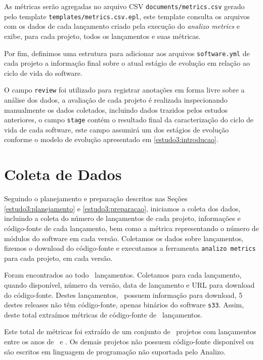 As métricas serão agregadas no arquivo CSV \texttt{documents/metrics.csv}
gerado pelo template \texttt{templates/metrics.csv.epl}, este template consulta
os arquivos com os dados de cada lançamento criado pela execução do {\it analizo metrics}
e exibe, para cada projeto, todos os lançamentos e suas métricas.

Por fim, definimos uma estrutura para adicionar aos arquivos \texttt{software.yml} de
cada projeto a informação final sobre o atual estágio de evolução em relação ao
ciclo de vida do software.

O campo \texttt{review} foi utilizado para registrar anotações em forma livre
sobre a análise dos dados, a avaliação de cada projeto é realizada
inspecionando manualmente os dados coletados, incluindo dados trazidos pelos
estudos anteriores, o campo \texttt{stage} contém o resultado final da
caracterização do ciclo de vida de cada software, este campo assumirá um dos
estágios de evolução conforme o modelo de evolução apresentado em
\ref{estudo3:introducao}.


\section{Coleta de Dados} \label{estudo3:coleta} %

Seguindo o planejamento e preparação descritos nas Seções
\ref{estudo3:planejamento} e \ref{estudo3:preparacao}, iniciamos a coleta dos
dados, incluindo a coleta do número de lançamentos de cada projeto, informações
e código-fonte de cada lançamento, bem como a métrica representando o número de
módulos do software em cada versão. Coletamos os dados sobre lançamentos,
fizemos o download do código-fonte e executamos a ferramenta \texttt{analizo
metrics} para cada projeto, em cada versão.

Foram encontrados ao todo \ReleasesCount \ lançamentos. Coletamos para cada
lançamento, quando disponível, número da versão, data de lançamento e URL para
download do código-fonte. Destes lançamentos, \ReleasesAvailableCount \ possuem
informação para download, 5 destes releases não têm código-fonte, apenas
binários do software \texttt{s33}. Assim, deste total extraímos métricas
de código-fonte de \ReleasesMetricsCount \ lançamentos.

Este total de métricas foi extraído de um conjunto de \ProjectsAnalizedCount \
projetos com lançamentos entre os anos de \ReleasesYearFirst \ e \ReleasesYearLast.
Os demais projetos não possuem código-fonte disponível ou são
escritos em linguagem de programação não suportada pelo Analizo.

